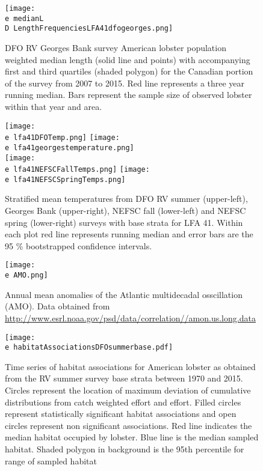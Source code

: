 \documentclass[11pt]{article}
\newcommand{\D}{.}
\newcommand{\e}{/backup/bio_data/bio.lobster/figures/} %
\begin{document}
\begin{figure}

    \texttt{[image: \\e medianL\\D LengthFrequenciesLFA41dfogeorges.png]}
    \caption{DFO RV Georges Bank survey American lobster population weighted median length (solid line and points) with accompanying first and third quartiles (shaded polygon) for the Canadian portion of the survey from 2007 to 2015. Red line represents a three year running median. Bars represent the sample size of observed lobster within that year and area.}

\end{figure}



\begin{figure}

    \texttt{[image: \\e lfa41DFOTemp.png]}
    \texttt{[image: \\e lfa41georgestemperature.png]}\\
    \texttt{[image: \\e lfa41NEFSCFallTemps.png]}
    \texttt{[image: \\e lfa41NEFSCSpringTemps.png]}\\
    \caption{Stratified mean temperatures from DFO RV summer (upper-left), Georges Bank (upper-right), NEFSC fall (lower-left) and NEFSC spring (lower-right) surveys with base strata for LFA 41. Within each plot red line represents running median and error bars are the 95 \% bootstrapped confidence intervals.}

\end{figure}



\begin{figure}

    \texttt{[image: \\e AMO.png]}
    \caption{Annual mean anomalies of the Atlantic multidecadal osscillation (AMO). Data obtained from \url{http://www.esrl.noaa.gov/psd/data/correlation//amon.us.long.data}}

\end{figure}






\begin{figure}

    \texttt{[image: \\e habitatAssociationsDFOsummerbase.pdf]}
    \caption{Time series of habitat associations for American lobster as obtained from the RV summer survey base strata between 1970 and 2015. Circles represent the location of maximum deviation of cumulative distributions from catch weighted effort and effort. Filled circles represent statistically significant habitat associations and open circles represent non significant associations. Red line indicates
the median habitat occupied by lobster. Blue line is the median sampled habitat. Shaded polygon in background is the 95th percentile for range of sampled habitat}

\end{figure}
\end{document}
